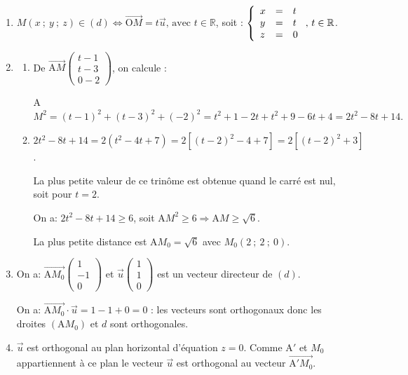 \documentclass[10pt]{article}
\providecommand{\R}{\mathbb{R}}
\providecommand{\vect}[1]{\overrightarrow{#1}}
\begin{document}
 \begin{enumerate}
\item 
$M(x~;~y~;~z) \in (d) \iff \vect{\text{O}M} = t\vect{u}, \, \text{avec } t \in \R$, soit :
$\left\{\begin{array}{l c l}
x&=&t\\
y&=&t\\
z&=&0
\end{array}\right., \, t \in \R$.

\item 
\begin{enumerate}
\item  
De $\vect{\text{A}M}\begin{pmatrix}t - 1\\t - 3\\0 - 2\end{pmatrix}$, on calcule :

A$M^2 = (t - 1)^2 + (t - 3)^2 + (- 2)^2 = t^2 + 1 - 2t + t^2 + 9 - 6t + 4 = 2t^2 - 8t+ 14.$


\item 


$2t^2 - 8t+ 14 = 2\left(t^2 - 4t + 7\right) = 2\left[(t - 2)^2 -  4 + 7 \right] = 2\left[(t - 2)^2 + 3\right]$.

La plus petite valeur de ce trinôme est obtenue quand le carré est nul, soit pour $t = 2$.

On a: $2t^2 - 8t+ 14 \geqslant 6$, soit $\text{A}M^2 \geqslant 6 \Rightarrow \text{A}M \geqslant \sqrt{6}$.

La plus petite distance est A$M_0 = \sqrt{6}$ avec $M_0(2~;~2~;~0)$.
\end{enumerate}
\item 
On a: $\vect{\text{A}M_0}\begin{pmatrix}1\\- 1\\0\end{pmatrix}$ et $\vect{u}\begin{pmatrix}1\\ 1\\0\end{pmatrix}$ est un vecteur directeur de $(d)$.

On a: $\vect{\text{A}M_0} \cdot \vect{u} = 1 - 1 + 0 = 0$ : les vecteurs sont orthogonaux donc les droites $\left(\text{A}M_0\right)$ et $d$ sont orthogonales.
\item 


$\vect{u}$ est orthogonal au plan horizontal d'équation $z = 0$. Comme A$'$ et $M_0$ appartiennent à ce plan le vecteur $\vect{u}$ est orthogonal au vecteur $\vect{\text{A}'M_0}$.


\end{enumerate}
\end{document}
